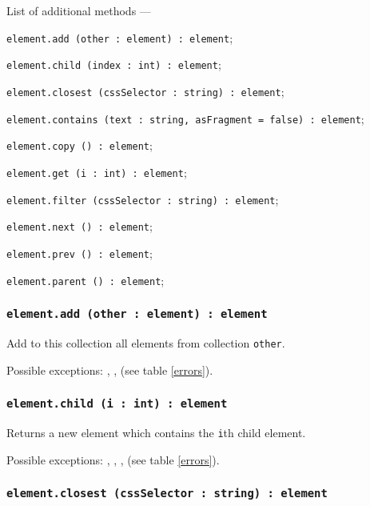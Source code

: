 \newpage
List of additional methods —
\begin{icItems}
	\item \texttt{element.add (other : element) : element};
	\item \texttt{element.child (index : int) : element};
	\item \texttt{element.closest (cssSelector : string) : element};
	\item \texttt{element.contains (text : string, asFragment = false) : element};
	\item \texttt{element.copy () : element};
	\item \texttt{element.get (i : int) : element};
	\item \texttt{element.filter (cssSelector : string) : element};
	\item \texttt{element.next () : element};
	\item \texttt{element.prev () : element};
	\item \texttt{element.parent () : element};
\end{icItems}

\subsubsection{\texttt{element.add (other : element) : element}}

Add to this collection all elements from collection \texttt{other}.

Possible exceptions: , ,  (see table \ref{errors}).

\subsubsection{\texttt{element.child (i : int) : element}}

Returns a new element which contains the \texttt{i}th child element.

Possible exceptions: , , ,  (see table \ref{errors}).

\subsubsection{\texttt{element.closest (cssSelector : string) : element}}

